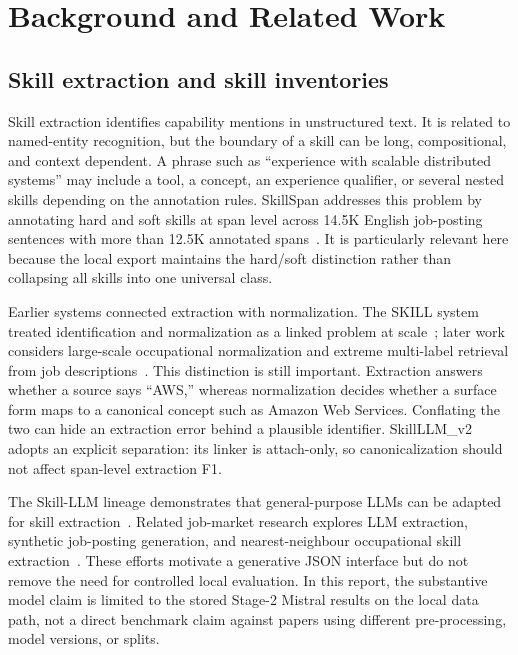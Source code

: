\chapter{Background and Related Work}
\label{ch:related-work}

\section{Skill extraction and skill inventories}

Skill extraction identifies capability mentions in unstructured text. It is related to named-entity recognition, but the boundary of a skill can be long, compositional, and context dependent. A phrase such as ``experience with scalable distributed systems'' may include a tool, a concept, an experience qualifier, or several nested skills depending on the annotation rules. SkillSpan addresses this problem by annotating hard and soft skills at span level across 14.5K English job-posting sentences with more than 12.5K annotated spans~\cite{zhang2022skillspan}. It is particularly relevant here because the local export maintains the hard/soft distinction rather than collapsing all skills into one universal class.

Earlier systems connected extraction with normalization. The SKILL system treated identification and normalization as a linked problem at scale~\cite{zhao2015skill}; later work considers large-scale occupational normalization and extreme multi-label retrieval from job descriptions~\cite{hoang2018largescale,bhola2020retrieving}. This distinction is still important. Extraction answers whether a source says ``AWS,'' whereas normalization decides whether a surface form maps to a canonical concept such as Amazon Web Services. Conflating the two can hide an extraction error behind a plausible identifier. SkillLLM\_v2 adopts an explicit separation: its linker is attach-only, so canonicalization should not affect span-level extraction F1.

The Skill-LLM lineage demonstrates that general-purpose LLMs can be adapted for skill extraction~\cite{herandi2024skillllm}. Related job-market research explores LLM extraction, synthetic job-posting generation, and nearest-neighbour occupational skill extraction~\cite{nguyen2024rethinking,magron2024jobskape,zhang2024nnose}. These efforts motivate a generative JSON interface but do not remove the need for controlled local evaluation. In this report, the substantive model claim is limited to the stored Stage-2 Mistral results on the local data path, not a direct benchmark claim against papers using different pre-processing, model versions, or splits.

